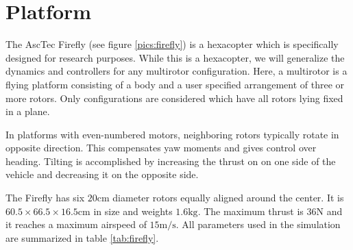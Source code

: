 \section{Platform}
The AscTec Firefly (see figure \ref{pics:firefly}) is a hexacopter which is specifically designed for research purposes. While this is a hexacopter, we will generalize the dynamics and controllers for any multirotor configuration. Here, a multirotor is a flying platform consisting of a body and a user specified arrangement of three or more rotors. Only configurations are considered which have all rotors lying fixed in a plane.

In platforms with even-numbered motors, neighboring rotors typically rotate in opposite direction. This compensates yaw moments and gives control over heading. Tilting is accomplished by increasing the thrust on on one side of the vehicle and decreasing it on the opposite side.

The Firefly has six $20 \si{\cm}$ diameter rotors equally aligned around the center. It is $60.5 \times 66.5 \times 16.5 \si{\cm}$ in size and weights $1.6 \si{\kg}$. The maximum thrust is $36 \si{\N}$ and it reaches a maximum airspeed of $15 \si{\metre\per\second}$. All parameters used in the simulation are summarized in table \ref{tab:firefly}.

